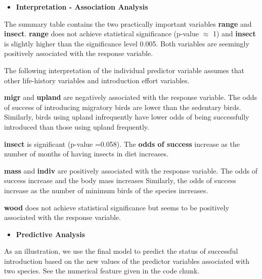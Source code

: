 \documentclass[
]{book}
\providecommand{\tightlist}{%
  \setlength{\itemsep}{0pt}\setlength{\parskip}{0pt}}
\begin{document}
\begin{itemize}
\tightlist
\item
  \textbf{Interpretation - Association Analysis}
\end{itemize}

The summary table contains the two practically important variables \textbf{range} and \textbf{insect}. \textbf{range} does not achieve statistical significance (p-value \(\approx\) 1) and \textbf{insect} is slightly higher than the significance level 0.005. Both variables are seemingly positively associated with the response variable.

The following interpretation of the individual predictor variable assumes that other life-history variables and introduction effort variables.

\textbf{migr} and \textbf{upland} are negatively associated with the response variable. The odds of success of introducing migratory birds are lower than the sedentary birds. Similarly, birds using upland infrequently have lower odds of being successfully introduced than those using upland frequently.

\textbf{insect} is significant (p-value =0.058). The \textbf{odds of success} increase as the number of months of having insects in diet increases.

\textbf{mass} and \textbf{indiv} are positively associated with the response variable. The odds of success increase and the body mass increases Similarly, the odds of success increase as the number of minimum birds of the species increases.

\textbf{wood} does not achieve statistical significance but seems to be positively associated with the response variable.

\begin{itemize}
\tightlist
\item
  \textbf{Predictive Analysis}
\end{itemize}

As an illustration, we use the final model to predict the status of successful introduction based on the new values of the predictor variables associated with two species. See the numerical feature given in the code chunk.
\end{document}
